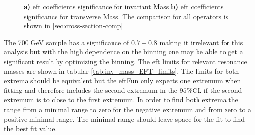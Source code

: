 \documentclass[../Bachelorarbeit.tex]{subfiles}
\begin{document}
\begin{figure}[h]
\begin{subfigure}{0.45\textwidth}
        \caption{}
    \end{subfigure}
    \caption{\textbf{a)} \acrshort{eft} coefficients significance for invariant Mass \textbf{b)} \acrshort{eft} coefficients significance for transverse Mass. The comparison for all operators is shown in \ref{sec:cross-section-comp}}
    \label{fig:corss-section-comparission}
\end{figure}

The 700 GeV sample has a significance of $0.7-0.8$ making it irrelevant for this analysis
but with the high dependence on the binning one may be able to get a significant result by optimizing the binning. The \acrshort{eft} limits for relevant resonance masses are shown in tabular \ref{tab:inv_mass_EFT_limits}. The limits for both extrema should be equivalent but the \acrshort{eft}Fun only expects one extremum when fitting
and therefore includes the second extremum in the $95\%$CL if the second extremum is to close to the first extremum.  In order to find both extrema the range from a minimal range to zero for the negative extremum and from zero to a positive minimal range.
The minimal range should leave space for the fit to find the best fit value.
\end{document}
